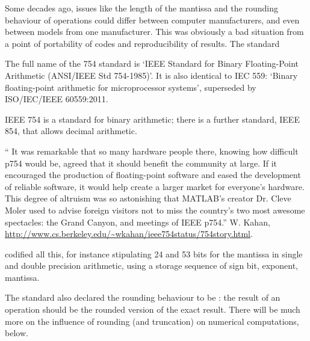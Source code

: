 Some decades ago, issues like the length of the
mantissa and the rounding behaviour of operations
could differ between computer manufacturers, and even between models
from one manufacturer. This was obviously a bad situation from a point
of portability of codes and reproducibility of results.
The  standard%
\begin{footnoteenv}
  {The full name of the 754 standard is `IEEE Standard for Binary
  Floating-Point Arithmetic (ANSI/IEEE Std 754-1985)'. It is also
  identical to IEC 559: `Binary floating-point arithmetic for
  microprocessor systems', superseded by ISO/IEC/IEEE 60559:2011.}
\end{footnoteenv}
%
%
\begin{footnoteenv}
  {IEEE 754 is a standard for binary arithmetic;
  there is a further standard, IEEE 854, that allows decimal
  arithmetic.}
\end{footnoteenv}
\begin{footnoteenv}
  {`` It was remarkable that so many hardware
  people there, knowing how difficult p754 would be, agreed that it
  should benefit the community at large. If it encouraged the
  production of floating-point software and eased the development of
  reliable software, it would help create a larger market for
  everyone's hardware. This degree of altruism was so astonishing that
  MATLAB's creator Dr. Cleve Moler used to advise foreign visitors not
  to miss the country's two most awesome spectacles: the Grand Canyon,
  and meetings of IEEE p754.'' W. Kahan,
  \url{http://www.cs.berkeley.edu/~wkahan/ieee754status/754story.html}.}
\end{footnoteenv}
codified all this, for instance stipulating 24 and 53 bits for the
mantissa in single and double precision arithmetic,
using a storage sequence of sign bit, exponent, mantissa. 


The standard also declared the rounding behaviour
to be : the result of an operation should be the
rounded version of the exact result. There will be much more on the
influence of rounding (and truncation) on numerical computations, below.

